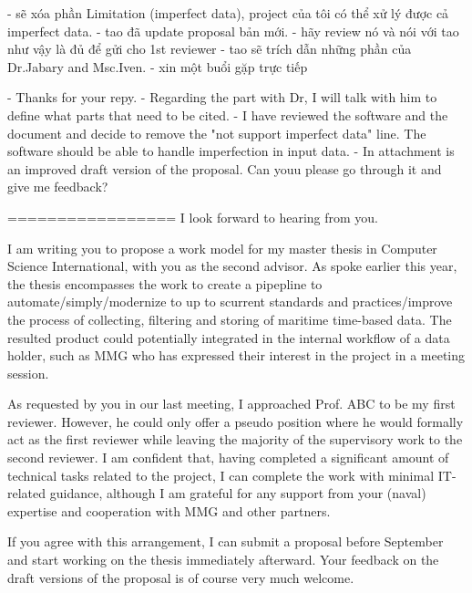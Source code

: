 - sẽ xóa phần Limitation (imperfect data), project của tôi có thể xử lý được cả imperfect data.
- tao đã update proposal bản mới.
- hãy review nó và nói với tao như vậy là đủ để gửi cho 1st reviewer
- tao sẽ trích dẫn những phần của Dr.Jabary and Msc.Iven.
- xin một buổi gặp trực tiếp


- Thanks for your repy.
- Regarding the part with Dr, I will talk with him to define what parts that need to be cited.
- I have reviewed the software and the document and decide to remove the "not support imperfect data" line. The software should be able to handle imperfection in input data.
- In attachment is an improved draft version of the proposal. Can youu please go through it and give me feedback?




=================
I look forward to hearing from you.





I am writing you to propose a work model for my master thesis in Computer Science International, with you as the second advisor.
As spoke earlier this year, the thesis encompasses the work to create a pipepline to automate/simply/modernize to up to scurrent standards and practices/improve the process of collecting, filtering and storing of maritime time-based data.
The resulted product could potentially integrated in the internal workflow of a data holder, such as MMG who has expressed their interest in the project in a meeting session.

As requested by you in our last meeting, I approached Prof. ABC to be my first reviewer. 
However, he could only offer a pseudo position where he would formally act as the first reviewer while leaving the majority of the supervisory work to the second reviewer.
I am confident that, having completed a significant amount of technical tasks related to the project, I can complete the work with minimal IT-related guidance, although I am grateful for any support from your (naval) expertise and cooperation with MMG and other partners.

If you agree with this arrangement, I can submit a proposal before September and start working on the thesis immediately afterward. Your feedback on the draft versions of the proposal is of course very much welcome. 




